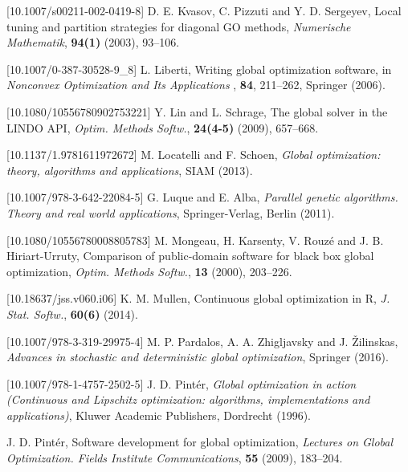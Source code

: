 \documentclass{aims}
\theoremstyle{definition}
\begin{document}
\begin{thebibliography}{10}
[10.1007/s00211-002-0419-8]
\newblock D. E. Kvasov, C. Pizzuti and Y. D. Sergeyev,
\newblock Local tuning and partition strategies for diagonal GO methods,
\newblock \emph{Numerische Mathematik}, \textbf{94(1)} (2003), 93--106.

[10.1007/0-387-30528-9_8]
\newblock L. Liberti,
\newblock Writing global optimization software,
\newblock in \emph{Nonconvex Optimization and Its Applications }, \textbf{84}, 211--262,
\newblock Springer (2006).

[10.1080/10556780902753221]
\newblock Y. Lin and L. Schrage,
\newblock The global solver in the LINDO API,
\newblock \emph{Optim. Methods Softw.}, \textbf{24(4-5)} (2009), 657--668.

[10.1137/1.9781611972672]
\newblock M. Locatelli and F. Schoen,
\newblock \emph{Global optimization: theory, algorithms and applications},
\newblock SIAM (2013).

[10.1007/978-3-642-22084-5]
\newblock G. Luque and E. Alba,
\newblock \emph{Parallel genetic algorithms. Theory and real world applications},
\newblock Springer-Verlag, Berlin (2011).

[10.1080/10556780008805783]
\newblock M. Mongeau, H. Karsenty, V. Rouzé and J. B. Hiriart-Urruty,
\newblock Comparison of public-domain software for black box global optimization,
\newblock \emph{Optim. Methods Softw.}, \textbf{13} (2000), 203--226.

[10.18637/jss.v060.i06]
\newblock K. M. Mullen,
\newblock Continuous global optimization in R,
\newblock \emph{J. Stat. Softw.}, \textbf{60(6)} (2014).

[10.1007/978-3-319-29975-4]
\newblock M. P. Pardalos, A. A. Zhigljavsky and J. \v Zilinskas,
\newblock \emph{Advances in stochastic and deterministic global optimization},
\newblock Springer (2016).

[10.1007/978-1-4757-2502-5]
\newblock J. D. Pint\'er,
\newblock \emph{Global optimization in action (Continuous and Lipschitz optimization: algorithms, implementations and applications)},
\newblock Kluwer Academic Publishers, Dordrecht (1996).

\newblock J. D. Pint\'er,
\newblock Software development for global optimization,
\newblock \emph{Lectures on Global Optimization. Fields Institute Communications}, \textbf{55} (2009), 183--204.


\end{thebibliography}
\end{document}
